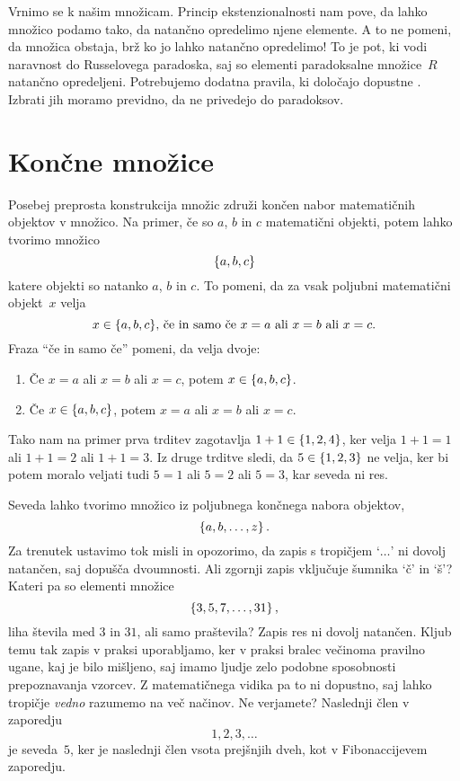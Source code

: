 Vrnimo se k našim množicam. Princip ekstenzionalnosti nam pove, da lahko množico podamo
tako, da natančno opredelimo njene elemente. A to ne pomeni, da množica obstaja, brž ko jo
lahko natančno opredelimo! To je pot, ki vodi naravnost do Russelovega paradoska, saj so
elementi paradoksalne množice~$R$ natančno opredeljeni. Potrebujemo dodatna pravila, ki
določajo dopustne . Izbrati jih moramo previdno, da ne privedejo
do paradoksov.

\section{Končne množice}
\label{sec:koncne-mnozice}

Posebej preprosta konstrukcija množic združi končen nabor matematičnih objektov v množico.
Na primer, če so $a$, $b$ in $c$ matematični objekti, potem lahko tvorimo množico
%
\begin{equation*}
  \set{a, b, c}
\end{equation*}
%
katere objekti so natanko $a$, $b$ in $c$. To pomeni, da za vsak poljubni matematični
objekt~$x$ velja
%
\begin{equation*}
  \text{$x \in \set{a, b, c}$, če in samo če $x = a$ ali $x = b$ ali $x = c$.}
\end{equation*}
%
Fraza ``če in samo če'' pomeni, da velja dvoje:
%
\begin{enumerate}
\item Če $x = a$ ali $x = b$ ali $x = c$, potem $x \in \set{a, b, c}$.
\item Če $x \in \set{a, b, c}$, potem $x = a$ ali $x = b$ ali $x = c$.
\end{enumerate}
%
Tako nam na primer prva trditev zagotavlja $1+1 \in \set{1, 2, 4}$, ker velja
$1 + 1 = 1$ ali $1 + 1 = 2$ ali $1 + 1 = 3$. Iz druge trditve sledi, da
$5 \in \set{1, 2, 3}$ ne velja, ker bi potem moralo veljati tudi $5 = 1$ ali $5 = 2$ ali
$5 = 3$, kar seveda ni res.

Seveda lahko tvorimo množico iz poljubnega končnega nabora objektov,
%
\begin{equation*}
  \set{a, b, \ldots, z}.
\end{equation*}
%
Za trenutek ustavimo tok misli in opozorimo, da zapis s tropičjem `$\ldots$' ni dovolj
natančen, saj dopušča dvoumnosti. Ali zgornji zapis vključuje šumnika `č' in `š'? Kateri
pa so elementi množice
%
\begin{equation*}
  \set{3, 5, 7, \ldots, 31},
\end{equation*}
%
liha števila med $3$ in $31$, ali samo praštevila? Zapis res ni dovolj natančen. Kljub
temu tak zapis v praksi uporabljamo, ker v praksi bralec večinoma pravilno ugane, kaj je
bilo mišljeno, saj imamo ljudje zelo podobne sposobnosti prepoznavanja vzorcev. Z
matematičnega vidika pa to ni dopustno, saj lahko tropičje \emph{vedno} razumemo na več
načinov. Ne verjamete? Naslednji člen v zaporedju
%
\begin{equation*}
  1, 2, 3, \ldots
\end{equation*}
%
je seveda~$5$, ker je naslednji člen vsota prejšnjih dveh, kot v Fibonaccijevem zaporedju.

